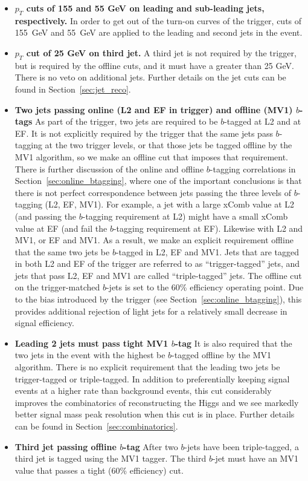 \begin{itemize}
\item
\textbf{$p_T$ cuts of 155 and 55 GeV on leading and sub-leading jets, respectively.}
In order to get out of the \pt turn-on curves of the trigger, cuts of
155~GeV and 55~GeV are applied to the leading and second jets in the
event.
\item
\textbf{$p_T$ cut of 25 GeV on third jet.}
A third jet is not required by the trigger, but is required by
the offline cuts, and it must have a \pt greater than 25 GeV.  There is
no veto on additional jets.  Further details on the jet cuts can be found
in Section~\ref{sec:jet_reco}.
\item
\textbf{Two jets passing online (L2 and EF in trigger) and offline (MV1) $b$-tags}
As part of the trigger, two jets are required to be $b$-tagged at L2 and at EF.  It
is not explicitly required by the trigger that the same jets pass $b$-tagging at the two trigger levels,
or that those jets be tagged offline by the MV1 algorithm, so we make an
offline cut that imposes that requirement.  There is further discussion of the online
and offline $b$-tagging correlations in Section~\ref{sec:online_btagging},
where one of the important conclusions is that there is not perfect correspondence
between jets passing the three levels of $b$-tagging (L2, EF, MV1).  For
example, a jet with a large xComb value at L2 (and passing the $b$-tagging
requirement at L2) might have a small xComb value at EF (and fail the $b$-tagging
requirement at EF).  Likewise with L2 and MV1, or EF and MV1.  As a result, we
make an explicit requirement offline that the same two jets be $b$-tagged in L2, EF
and MV1.  Jets that are tagged in both L2 and EF of the trigger are referred to as
``trigger-tagged'' jets, and jets that pass L2, EF and MV1 are called ``triple-tagged''
jets.
The offline cut on the
trigger-matched $b$-jets is set to the 60\% efficiency
operating point. Due to the bias introduced by the trigger (see
Section~\ref{sec:online_btagging}), this provides additional rejection of
light jets for a relatively small decrease in signal efficiency.


\item\textbf{Leading 2 jets must pass tight MV1 $b$-tag}
It is also required that the two jets in the event with the highest \pt be $b$-tagged
offline by the MV1 algorithm.  There is no explicit requirement that the leading
two jets be trigger-tagged or triple-tagged.
  In addition to preferentially keeping signal events at a higher rate than
background events, this cut considerably improves the combinatorics of reconstructing
the Higgs and we see markedly better signal mass peak resolution when this cut is in
place.  Further details can be found in Section~\ref{sec:combinatorics}.


\item
\textbf{Third jet passing offline $b$-tag}
After two
$b$-jets have been triple-tagged, a third jet is tagged using the MV1 tagger.  The third
$b$-jet must have an MV1 value that passes a tight (60\% efficiency)
cut.

\end{itemize}




